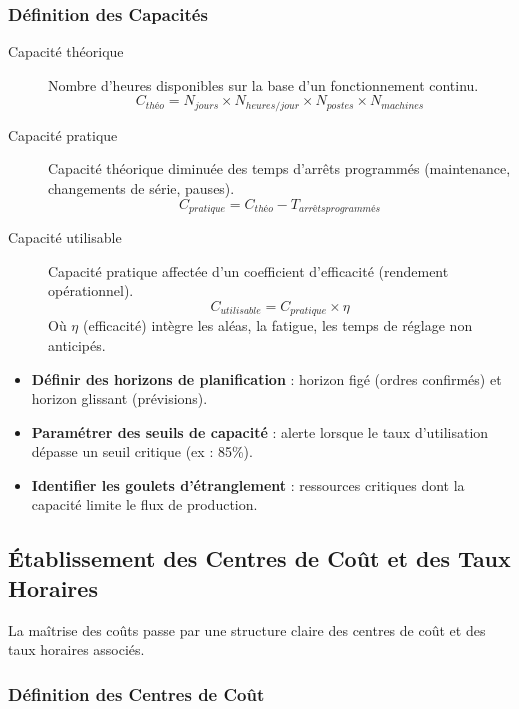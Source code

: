 \documentclass{article}
\begin{document}
\subsubsection{Définition des Capacités}

\begin{description}
    \item[Capacité théorique] Nombre d'heures disponibles sur la base d'un fonctionnement continu.
    \[
    C_{théo} = N_{jours} \times N_{heures/jour} \times N_{postes} \times N_{machines}
    \]
    
    \item[Capacité pratique] Capacité théorique diminuée des temps d'arrêts programmés (maintenance, changements de série, pauses).
    \[
    C_{pratique} = C_{théo} - T_{arrêts programmés}
    \]
    
    \item[Capacité utilisable] Capacité pratique affectée d'un coefficient d'efficacité (rendement opérationnel).
    \[
    C_{utilisable} = C_{pratique} \times \eta
    \]
    Où $\eta$ (efficacité) intègre les aléas, la fatigue, les temps de réglage non anticipés.
\end{description}

\begin{tcolorbox}[colback=yellow!10!white, colframe=yellow!50!black, title=Bonnes pratiques]
\begin{itemize}
    \item \textbf{Définir des horizons de planification} : horizon figé (ordres confirmés) et horizon glissant (prévisions).
    \item \textbf{Paramétrer des seuils de capacité} : alerte lorsque le taux d'utilisation dépasse un seuil critique (ex : 85\%).
    \item \textbf{Identifier les goulets d'étranglement} : ressources critiques dont la capacité limite le flux de production.
\end{itemize}
\end{tcolorbox}

\subsection{Établissement des Centres de Coût et des Taux Horaires}

La maîtrise des coûts passe par une structure claire des centres de coût et des taux horaires associés.

\subsubsection{Définition des Centres de Coût}
\end{document}
